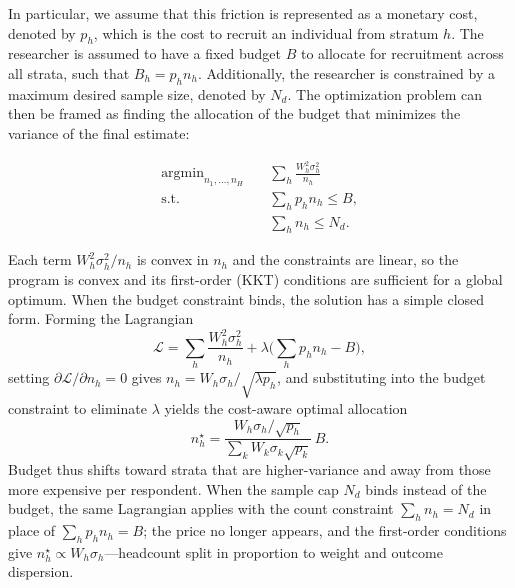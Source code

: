 \documentclass[letterpaper,12pt]{article}
\theoremstyle{proposition}
\DeclareMathOperator*{\argmin}{argmin}
\begin{document}

In particular, we assume that this friction is represented as a monetary cost, denoted by \( p_h \), which is the cost to recruit an individual from stratum \( h \). The researcher is assumed to have a fixed budget \( B \) to allocate for recruitment across all strata, such that \( B_h = p_hn_h \). Additionally, the researcher is constrained by a maximum desired sample size, denoted by \( N_d \). The optimization problem can then be framed as finding the allocation of the budget that minimizes the variance of the final estimate:

\[
\begin{aligned}
\argmin_{n_1, \ldots, n_H} &\quad \sum_{h} \frac{W_h^2 \sigma_h^2}{n_h} \\
\text{s.t.} &\quad \sum_h p_h n_h \leq B, \\
            &\quad \sum_h n_h \leq N_d.
\end{aligned}
\]



Each term $W_h^2\sigma_h^2/n_h$ is convex in $n_h$ and the constraints are linear, so the program is convex and its first-order (KKT) conditions are sufficient for a global optimum. When the budget constraint binds, the solution has a simple closed form. Forming the Lagrangian
$$
\mathcal{L} = \sum_h \frac{W_h^2\sigma_h^2}{n_h} + \lambda\Big(\sum_h p_h n_h - B\Big),
$$
setting $\partial\mathcal{L}/\partial n_h = 0$ gives $n_h = W_h\sigma_h/\sqrt{\lambda p_h}$, and substituting into the budget constraint to eliminate $\lambda$ yields the cost-aware optimal allocation
$$
n_h^\star = \frac{W_h\sigma_h/\sqrt{p_h}}{\sum_k W_k\sigma_k\sqrt{p_k}}\,B.
$$
Budget thus shifts toward strata that are higher-variance and away from those more expensive per respondent. When the sample cap $N_d$ binds instead of the budget, the same Lagrangian applies with the count constraint $\sum_h n_h = N_d$ in place of $\sum_h p_h n_h = B$; the price no longer appears, and the first-order conditions give $n_h^\star\propto W_h\sigma_h$---headcount split in proportion to weight and outcome dispersion.
\end{document}
